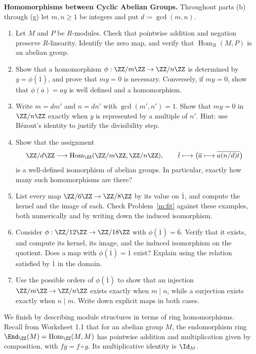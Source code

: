 \documentclass[12pt,reqno]{amsart}
\providecommand{\Hom}{\operatorname{Hom}}
\begin{document}
\begin{problems}
\item\label{m:cyclic} \textbf{Homomorphisms between Cyclic Abelian Groups.} Throughout parts (b) through (g) let $m,n\geq1$ be integers and put $d\coloneqq\gcd(m,n)$.
\begin{enumerate}
\item Let $M$ and $P$ be $R$-modules. Check that pointwise addition and negation preserve $R$-linearity. Identify the zero map, and verify that $\Hom_R(M,P)$ is an abelian group.
\item Show that a homomorphism $\phi:\ZZ/m\ZZ\to\ZZ/n\ZZ$ is determined by $y=\phi(\overline1)$, and prove that $my=0$ is necessary. Conversely, if $my=0$, show that $\phi(\overline a)=ay$ is well defined and a homomorphism.
\item Write $m=dm'$ and $n=dn'$ with $\gcd(m',n')=1$. Show that $my=0$ in $\ZZ/n\ZZ$ exactly when $y$ is represented by a multiple of $n'$. Hint: use B\'ezout's identity to justify the divisibility step.
\item Show that the assignment
\[
 \ZZ/d\ZZ\longrightarrow\Hom_{\ZZ}(\ZZ/m\ZZ,\ZZ/n\ZZ),\qquad
 \overline t\longmapsto
 \bigl(\overline a\longmapsto\overline{a(n/d)t}\bigr)
\]
is a well-defined isomorphism of abelian groups. In particular, exactly how many such homomorphisms are there?
\item List every map $\ZZ/6\ZZ\to\ZZ/8\ZZ$ by its value on $\overline1$, and compute the kernel and the image of each. Check Problem~\ref{m:fit} against these examples, both numerically and by writing down the induced isomorphism.
\item Consider $\phi:\ZZ/12\ZZ\to\ZZ/18\ZZ$ with $\phi(\overline1)=\overline6$. Verify that it exists, and compute its kernel, its image, and the induced isomorphism on the quotient. Does a map with $\phi(\overline1)=\overline1$ exist? Explain using the relation satisfied by $\overline1$ in the domain.
\item Use the possible orders of $\phi(\overline1)$ to show that an injection $\ZZ/m\ZZ\to\ZZ/n\ZZ$ exists exactly when $m\mid n$, while a surjection exists exactly when $n\mid m$. Write down explicit maps in both cases.
\end{enumerate}
\end{problems}

\hrulefill


We finish by describing module structures in terms of ring homomorphisms. Recall from Worksheet 1.1 that for an abelian group $M$, the endomorphism ring $\End_{\ZZ}(M)=\Hom_{\ZZ}(M,M)$ has pointwise addition and multiplication given by composition, with $fg=f\circ g$. Its multiplicative identity is $\Id_M$.
\end{document}
